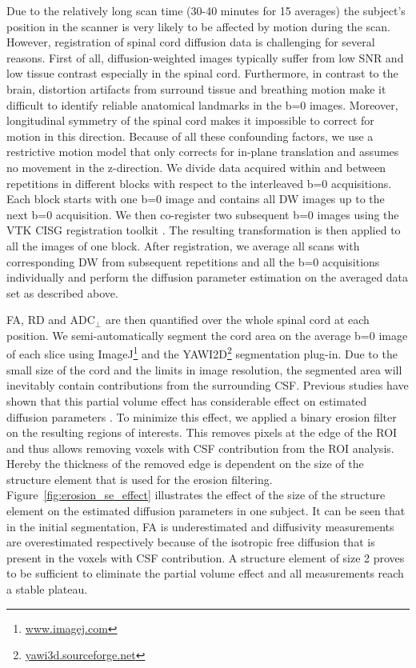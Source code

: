 Due to the relatively long scan time (30-40 minutes for 15 averages) the subject’s position in the scanner is very likely to be affected by motion during the scan. However, registration of spinal cord diffusion data is challenging for several reasons. First of all, diffusion-weighted images typically suffer from low SNR and low tissue contrast especially in the spinal cord. Furthermore, in contrast to the brain, distortion artifacts from surround tissue and breathing motion make it difficult to identify reliable anatomical landmarks in the b=0 images. Moreover, longitudinal symmetry of the spinal cord makes it impossible to correct for motion in this direction. Because of all these confounding factors, we use a restrictive motion model that only corrects for in-plane translation and assumes no movement in the z-direction. We divide data acquired within and between repetitions in different blocks with respect to the interleaved b=0 acquisitions. Each block starts with one b=0 image and contains all DW images up to the next b=0 acquisition. We then co-register two subsequent b=0 images using the VTK CISG registration toolkit \citep{Hartkens:2002}. The resulting transformation is then applied to all the images of one block. After registration, we average all scans with corresponding DW from subsequent repetitions and all the b=0 acquisitions individually and perform the diffusion parameter estimation on the averaged data set as described above.

FA, RD and ADC$_\perp$ are then quantified over the whole spinal cord at each position. We semi-automatically segment the cord area on the average b=0 image of each slice using ImageJ\footnote{\url{www.imagej.com}} and the YAWI2D\footnote{\url{yawi3d.sourceforge.net}} segmentation plug-in. Due to the small size of the cord and the limits in image resolution, the segmented area will inevitably contain contributions from the surrounding CSF. Previous studies have shown that this partial volume effect has considerable effect on estimated diffusion parameters \citep{Alexander:2001}. To minimize this effect, we applied a binary erosion filter on the resulting regions of interests. This removes pixels at the edge of the ROI and thus allows removing voxels with CSF contribution from the ROI analysis. Hereby the thickness of the removed edge is dependent on the size of the structure element that is used for the erosion filtering. Figure~\ref{fig:erosion_se_effect} illustrates the effect of the size of the structure element on the estimated diffusion parameters in one subject. It can be seen that in the initial segmentation, FA is underestimated and diffusivity measurements are overestimated respectively because of the isotropic free diffusion that is present in the voxels with CSF contribution. A structure element of size 2 proves to be sufficient to eliminate the partial volume effect and all measurements reach a stable plateau.

